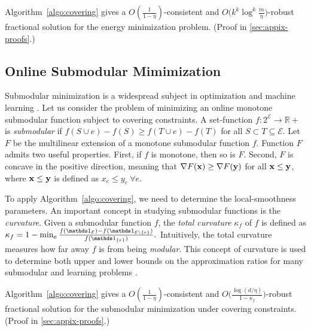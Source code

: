 \begin{proposition}
Algorithm~\ref{algo:covering} gives a
$O(\frac{1}{1 - \eta})$-consistent and $O\bigl(k^{k} \log^{k} \frac{m}{\eta}\bigr)$-robust fractional solution
for the energy minimization problem. (Proof in \cref{sec:appix-proofs}.)
\end{proposition}


\subsection{Online Submodular Mimimization}	\label{sec:sub-min}

Submodular minimization is a widespread subject in optimization and machine learning \citep{IwataFleischer01:A-combinatorial-strongly,Bachothers13:Learning-with,Bach16:Submodular-functions:,BalkanskiSinger:2020}. Let us consider the problem of minimizing an online monotone submodular function subject to covering constraints.
A set-function $f: 2^{\mathcal{E}} \rightarrow \mathbb{R}+$ is \emph{submodular} if
$f(S \cup e) - f(S) \geq f(T \cup e) - f(T)$ for all $S \subset T \subseteq \mathcal{E}$.
Let $F$ be the multilinear extension of a monotone submodular function $f$. Function $F$
admits two useful properties. First, if $f$ is monotone, then so is $F$. Second, $F$ is concave in
the positive direction, meaning that $\nabla F(\mathbf{x}) \geq \nabla F(\mathbf{y})$ for all $\mathbf{x} \leq \mathbf{y}$, where $\mathbf{x} \leq \mathbf{y}$ is defined as $x_{e} \leq y_{e} ~\forall e$.

To apply Algorithm~\ref{algo:covering}, we need to determine the local-smoothness parameters.
An important concept in studying submodular functions is the \emph{curvature}. Given a submodular
function $f$, the \emph{total curvature} $\kappa_{f}$ \citep{ConfortiCornuejols84:Submodular-set-functions} of $f$ is defined as
$
\kappa_{f} = 1 - \min_{e} \frac{f(\one_{\mathcal{E}}) - f(\one_{\mathcal{E} \setminus \{e\}})}{f(\one_{\{e\}})}.
$
Intuitively, the total curvature measures how far away $f$ is from being \emph{modular}. This concept of
curvature is used to determine both upper and lower bounds on the approximation ratios
for many submodular and learning problems \citep{ConfortiCornuejols84:Submodular-set-functions,GoemansHarvey09:Approximating-submodular,BalcanHarvey12:Learning-Submodular,Vondrak10:Submodularity-and-Curvature:,IyerJegelka13:Curvature-and-optimal,SviridenkoVondrak17:Optimal-approximation}.

\begin{proposition}
Algorithm~\ref{algo:covering} gives a
$O(\frac{1}{1 - \eta})$-consistent and $O\bigl( \frac{\log (d/\eta)}{1 - \kappa_{f}} \bigr)$-robust fractional  solution
for the submodular minimization under covering constraints. (Proof in \cref{sec:appix-proofs}.)
\end{proposition}
